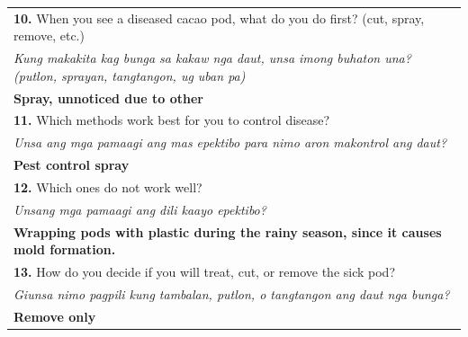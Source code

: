 \begin{longtable}{|p{4cm}|p{10cm}|}
		\multicolumn{2}{|p{12cm}|}{\vspace{0.1cm} \textbf{10.} When you see a diseased cacao pod, what do you do first? (cut, spray, remove, etc.)}                                            \\
		\multicolumn{2}{|p{12cm}|}{\textit{Kung makakita kag bunga sa kakaw nga daut, unsa imong buhaton una? (putlon, sprayan, tangtangon, ug uban pa)}}                                      \\
		\multicolumn{2}{|p{12cm}|}{\textbf{Spray, unnoticed due to other}}                                                                                                                     \\

		\multicolumn{2}{|p{12cm}|}{\vspace{0.1cm} \textbf{11.} Which methods work best for you to control disease?}                                                                            \\
		\multicolumn{2}{|p{12cm}|}{\textit{Unsa ang mga pamaagi ang mas epektibo para nimo aron makontrol ang daut?}}                                                                          \\
		\multicolumn{2}{|p{12cm}|}{\textbf{Pest control spray}}                                                                                                                                \\

		\multicolumn{2}{|p{12cm}|}{\vspace{0.1cm} \textbf{12.} Which ones do not work well?}                                                                                                   \\
		\multicolumn{2}{|p{12cm}|}{\textit{Unsang mga pamaagi ang dili kaayo epektibo?}}                                                                                                       \\
		\multicolumn{2}{|p{12cm}|}{\textbf{Wrapping pods with plastic during the rainy season, since it causes mold formation.}}                                                               \\

		\multicolumn{2}{|p{12cm}|}{\vspace{0.1cm} \textbf{13.} How do you decide if you will treat, cut, or remove the sick pod?}                                                              \\
		\multicolumn{2}{|p{12cm}|}{\textit{Giunsa nimo pagpili kung tambalan, putlon, o tangtangon ang daut nga bunga?}}                                                                       \\
		\multicolumn{2}{|p{12cm}|}{\textbf{Remove only}}                                                                                                                                       \\


\end{longtable}

